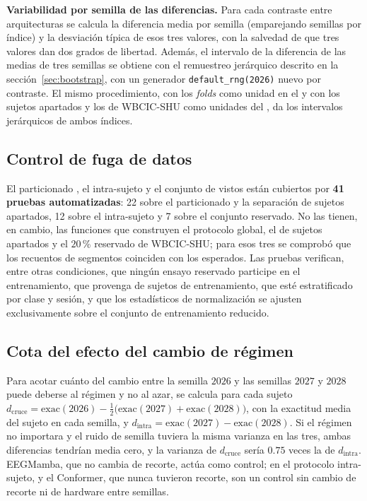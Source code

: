 \textbf{Variabilidad por semilla de las diferencias.} Para cada contraste entre
arquitecturas se calcula la diferencia media por semilla (emparejando semillas por índice) y
la desviación típica de esos tres valores, con la salvedad de que tres valores dan dos
grados de libertad. Además, el intervalo de la diferencia de las medias de tres semillas
se obtiene con el remuestreo jerárquico descrito en la sección~\ref{sec:bootstrap}, con un
generador \texttt{default\_rng(2026)} nuevo por contraste. El mismo procedimiento, con los \textit{folds} \loso{}
como unidad en el \dsi{} y con los sujetos apartados y los de WBCIC-SHU como unidades del
\idp{}, da los intervalos jerárquicos de ambos índices.


\subsection{Control de fuga de datos}

El particionado \loso{}, el intra-sujeto y el conjunto de vistos están cubiertos por
\textbf{41 pruebas automatizadas}: 22
sobre el particionado \loso{} y la separación de sujetos apartados, 12 sobre el
intra-sujeto y 7 sobre el conjunto reservado. No las tienen, en cambio, las funciones que
construyen el protocolo global, el de sujetos apartados y el $20$\,\% reservado de
WBCIC-SHU; para esos tres se comprobó que los recuentos de segmentos coinciden con los
esperados. Las pruebas verifican, entre otras condiciones, que ningún ensayo reservado
participe en el entrenamiento, que provenga de sujetos de entrenamiento, que
esté estratificado por clase y sesión, y que los estadísticos de normalización
se ajusten exclusivamente sobre el conjunto de entrenamiento reducido.

\subsection{Cota del efecto del cambio de régimen}
\label{sec:cota-confusor}

Para acotar cuánto del cambio entre la semilla $2026$ y las semillas $2027$ y $2028$ puede
deberse al régimen y no al azar, se calcula para cada sujeto $d_{\mathrm{cruce}} =
\mathrm{exac}(2026) - \tfrac12\bigl(\mathrm{exac}(2027) + \mathrm{exac}(2028)\bigr)$, con la
exactitud media del sujeto en cada semilla, y $d_{\mathrm{intra}} = \mathrm{exac}(2027) -
\mathrm{exac}(2028)$. Si el régimen no importara y el ruido de semilla tuviera la misma
varianza en las tres, ambas diferencias tendrían media cero, y la varianza de
$d_{\mathrm{cruce}}$ sería $0.75$ veces la de $d_{\mathrm{intra}}$. EEGMamba, que no cambia de
recorte, actúa como control; en el protocolo intra-sujeto, \eegnet{} y el Conformer, que
nunca tuvieron recorte, son un control sin cambio de recorte ni de hardware entre
semillas.

